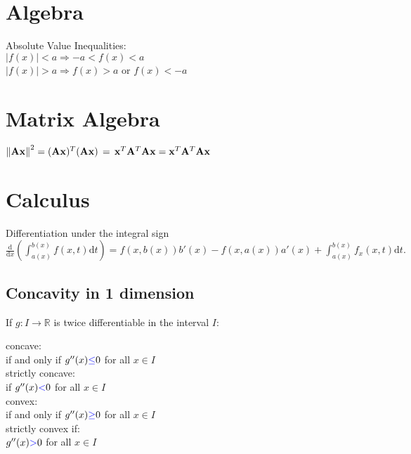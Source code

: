 \section{Algebra}
Absolute Value Inequalities:\\
$ |f(x)| < a  \Rightarrow  -a < f(x) < a$\\ 
$|f(x)| > a  \Rightarrow f(x) > a$ or $f(x) < -a$\\
\section{Matrix Algebra}

$\displaystyle  \displaystyle \left\lVert \mathbf{A}\mathbf{x}\right\rVert ^2 = \displaystyle (\mathbf{A}\mathbf{x})^ T(\mathbf{A}\mathbf{x})\, =\, \mathbf{x}^ T\mathbf{A}^ T\mathbf{A}\mathbf{x} = \displaystyle \mathbf{x}^ T\mathbf{A}^ T\mathbf{A}\mathbf{x}\qquad$

\section{Calculus}

Differentiation under the integral sign\\
$\frac{\text{d}}{\text{d}x}\left( \int_{a(x)}^{b(x)}f(x,t)\text{d}t \right ) = f(x,b(x))b'(x)-f(x,a(x))a'(x)+\int_{a(x)}^{b(x)}f_x(x,t)\text{d}t.$

\subsection*{Concavity in 1 dimension}
If $g:I \to \mathbb {R}$ is twice differentiable in the interval $I$:

concave:\\ 
if and only if $g^{\prime \prime }(x) {\color{blue}{\leq }}  0$ for all $x \in I$\\

strictly concave:\\
if $g^{\prime \prime }(x) {\color{blue}{<}}  0$ for all $x \in I$\\

convex:\\ 
if and only if $g^{\prime \prime }(x) {\color{blue}{\geq }}  0$ for all $x \in I$\\

strictly convex if:\\
$g^{\prime \prime }(x) {\color{blue}{>}}  0$ for all $x \in I$\\

